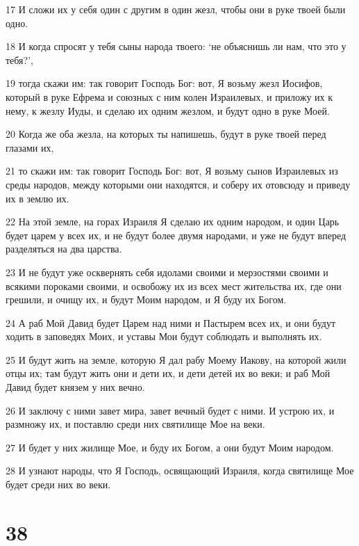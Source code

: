 \par 17 И сложи их у себя один с другим в один жезл, чтобы они в руке твоей были одно.
\par 18 И когда спросят у тебя сыны народа твоего: `не объяснишь ли нам, что это у тебя?',
\par 19 тогда скажи им: так говорит Господь Бог: вот, Я возьму жезл Иосифов, который в руке Ефрема и союзных с ним колен Израилевых, и приложу их к нему, к жезлу Иуды, и сделаю их одним жезлом, и будут одно в руке Моей.
\par 20 Когда же оба жезла, на которых ты напишешь, будут в руке твоей перед глазами их,
\par 21 то скажи им: так говорит Господь Бог: вот, Я возьму сынов Израилевых из среды народов, между которыми они находятся, и соберу их отовсюду и приведу их в землю их.
\par 22 На этой земле, на горах Израиля Я сделаю их одним народом, и один Царь будет царем у всех их, и не будут более двумя народами, и уже не будут вперед разделяться на два царства.
\par 23 И не будут уже осквернять себя идолами своими и мерзостями своими и всякими пороками своими, и освобожу их из всех мест жительства их, где они грешили, и очищу их, и будут Моим народом, и Я буду их Богом.
\par 24 А раб Мой Давид будет Царем над ними и Пастырем всех их, и они будут ходить в заповедях Моих, и уставы Мои будут соблюдать и выполнять их.
\par 25 И будут жить на земле, которую Я дал рабу Моему Иакову, на которой жили отцы их; там будут жить они и дети их, и дети детей их во веки; и раб Мой Давид будет князем у них вечно.
\par 26 И заключу с ними завет мира, завет вечный будет с ними. И устрою их, и размножу их, и поставлю среди них святилище Мое на веки.
\par 27 И будет у них жилище Мое, и буду их Богом, а они будут Моим народом.
\par 28 И узнают народы, что Я Господь, освящающий Израиля, когда святилище Мое будет среди них во веки.

\chapter{38}

